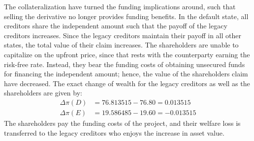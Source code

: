 \documentclass[../main.tex]{subfiles}
\begin{document}
        The collateralization have turned the funding implications around,
        such that selling the derivative no longer provides funding benefits.
        In the default state, all creditors share the independent amount 
        such that the payoff of the legacy creditors increases. 
        Since the legacy creditors maintain their payoff in all other states,
        the total value of their claim increases.
        The shareholders are unable to capitalize on the upfront price,
        since that rests with the counterparty earning the risk-free rate.
        Instead, they bear the funding costs of obtaining unsecured funds 
        for financing the independent amount;
        hence, the value of the shareholders claim have decreased.
        The exact change of wealth for the legacy creditors as well as the shareholders are given by:
            \begin{align}
                \Delta \pi(D) &= \num{76.813515} - \num{76.80} = \num{0.013515}\\
                \Delta \pi(E) &= \num{19.586485} - \num{19.60} = \num{-0.013515}
            \end{align}
        The shareholders pay the funding costs of the project,
        and their welfare loss is transferred to the legacy creditors
        who enjoys the increase in asset value.
\end{document}
